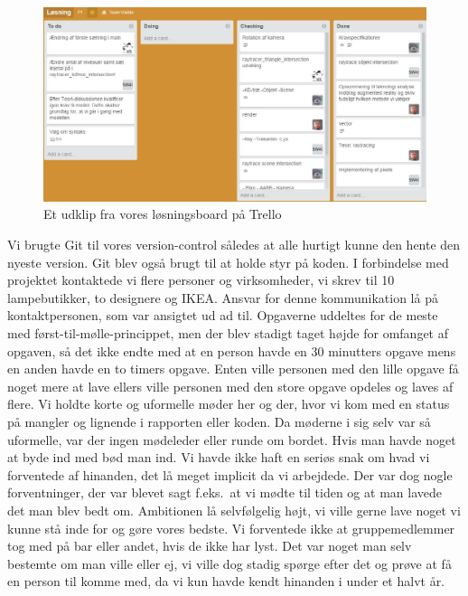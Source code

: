 \documentclass[oneside,a4paper,titlepage]{article}
\begin{document}
\begin{figure}[H]
    \centering
    \includegraphics[width=15cm]{./../graphics/trello}
    \caption{Et udklip fra vores løsningsboard på Trello}
    \label{fig:trello}
\end{figure} 
Vi brugte Git til vores version-control således at alle hurtigt kunne den hente den nyeste version. Git blev også brugt til at holde styr på koden. I forbindelse med projektet kontaktede vi flere personer og virksomheder, vi skrev til 10 lampebutikker, to designere og IKEA. Ansvar for denne kommunikation lå på kontaktpersonen, som var ansigtet ud ad til. \newline\newline
Opgaverne uddeltes for de meste med først-til-mølle-princippet, men der blev stadigt taget højde for omfanget af opgaven, så det ikke endte med at en person havde en 30 minutters opgave mens en anden havde en to timers opgave. Enten ville personen med den lille opgave få noget mere at lave ellers ville personen med den store opgave opdeles og laves af flere. Vi holdte korte og uformelle møder her og der, hvor vi kom med en status på mangler og lignende i rapporten eller koden. Da møderne i sig selv var så uformelle, var der ingen mødeleder eller runde om bordet. Hvis man havde noget at byde ind med bød man ind. \newline\newline
Vi havde ikke haft en seriøs snak om hvad vi forventede af hinanden, det lå meget implicit da vi arbejdede. Der var dog nogle forventninger, der var blevet sagt f.eks.\ at vi mødte til tiden og at man lavede det man blev bedt om. Ambitionen lå selvfølgelig højt, vi ville gerne lave noget vi kunne stå inde for og gøre vores bedste. Vi forventede ikke at gruppemedlemmer tog med på bar eller andet, hvis de ikke har lyst. Det var noget man selv bestemte om man ville eller ej, vi ville dog stadig spørge efter det og prøve at få en person til komme med, da vi kun havde kendt hinanden i under et halvt år. \newline\newline
\end{document}
